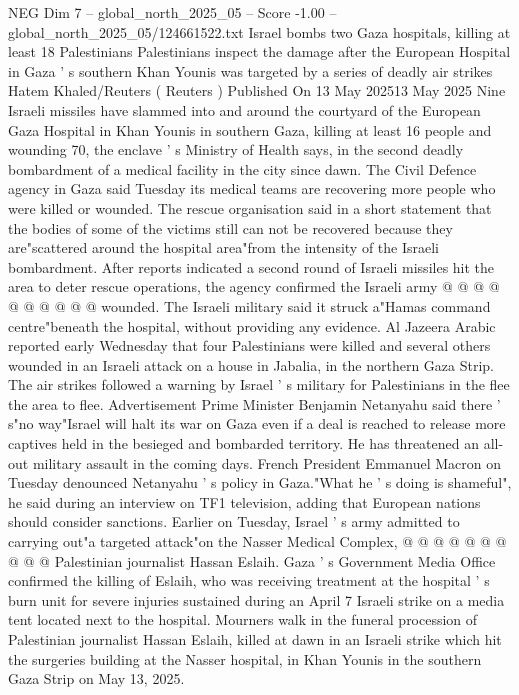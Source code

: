 \begin{textsample}{NEG Dim 7 – global\_north\_2025\_05 – Score -1.00 – global\_north\_2025\_05/124661522.txt}  \label{ex:f7_neg_127}
Israel bombs two Gaza hospitals, killing at least 18 Palestinians Palestinians inspect the damage after the European Hospital in Gaza ' s southern Khan Younis was targeted by a series of deadly air strikes Hatem Khaled/Reuters ( Reuters ) Published On 13 May 202513 May 2025 Nine Israeli missiles have slammed into and around the courtyard of the European Gaza Hospital in Khan Younis in southern Gaza, killing at least 16 people and wounding 70, the enclave ' s Ministry of Health says, in the second deadly bombardment of a medical facility in the city since dawn.
The Civil Defence agency in Gaza said Tuesday its medical teams are recovering more people who were killed or wounded.
The rescue organisation said in a short statement that the bodies of some of the victims still can not be recovered because they are"scattered around the hospital area"from the intensity of the Israeli bombardment.
After reports indicated a second round of Israeli missiles hit the area to deter rescue operations, the agency confirmed the Israeli army @ @ @ @ @ @ @ @ @ @ wounded.
The Israeli military said it struck a"Hamas command centre"beneath the hospital, without providing any evidence.
Al Jazeera Arabic reported early Wednesday that four Palestinians were killed and several others wounded in an Israeli attack on a house in Jabalia, in the northern Gaza Strip.
The air strikes followed a warning by Israel ' s military for Palestinians in the flee the area to flee.
Advertisement Prime Minister Benjamin Netanyahu said there ' s"no way"Israel will halt its war on Gaza even if a deal is reached to release more captives held in the besieged and bombarded territory.
He has threatened an all-out military assault in the coming days.
French President Emmanuel Macron on Tuesday denounced Netanyahu ' s policy in Gaza."What he ' s doing is shameful", he said during an interview on TF1 television, adding that European nations should consider sanctions.
Earlier on Tuesday, Israel ' s army admitted to carrying out"a targeted attack"on the Nasser Medical Complex, @ @ @ @ @ @ @ @ @ @ Palestinian journalist Hassan Eslaih.
Gaza ' s Government Media Office confirmed the killing of Eslaih, who was receiving treatment at the hospital ' s burn unit for severe injuries sustained during an April 7 Israeli strike on a media tent located next to the hospital.
Mourners walk in the funeral procession of Palestinian journalist Hassan Eslaih, killed at dawn in an Israeli strike which hit the surgeries building at the Nasser hospital, in Khan Younis in the southern Gaza Strip on May 13, 2025.

\end{textsample}
